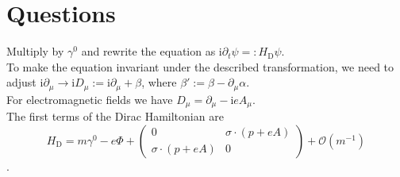 \documentclass[english, parskip=full]{scrartcl}
\title{\titel}
\author{\autor}
\date{\today}
\newcommand{\tecxt}{}
\def\I{\text{i}}
\begin{document}
\maketitle  %

\section{Questions}
Multiply by $\gamma^0$ and rewrite the equation as $\I\partial_t\psi=:H_\tecxt\text{D}\psi$. \\
To make the equation invariant under the described transformation, we need to adjust $\I\partial_\mu\rightarrow \I D_\mu :=\I\partial_\mu + \beta$, where $\beta':=\beta - \partial_\mu\alpha$. \\
For electromagnetic fields we have $D_\mu=\partial_\mu -\I eA_\mu$.\\
The first terms of the Dirac Hamiltonian are 
$$H_\tecxt\text{D}=m\gamma^0-e\Phi+\begin{pmatrix}
0&\sigma\cdot (p+eA)\\ \sigma\cdot (p+eA)&0
\end{pmatrix} +\mathcal{O}(m^{-1})$$.
\end{document}
